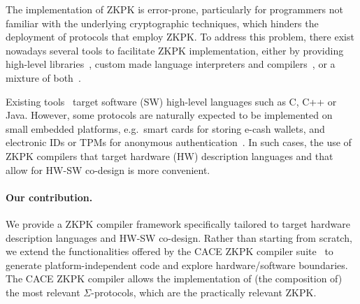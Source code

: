 
The implementation of ZKPK is error-prone, particularly for programmers not familiar with the underlying cryptographic techniques, which hinders the deployment of protocols that employ ZKPK. To address this problem, there exist nowadays several tools to facilitate ZKPK implementation, either by providing high-level libraries~\cite{Camenisch:2002:DII:586110.586114}, custom made language interpreters and compilers~\cite{Almeida:2010:CCZ:1888881.1888894}, or a mixture of both~\cite{Meiklejohn:2010:ZLS:1929820.1929838}.

Existing tools~\cite{Camenisch:2002:DII:586110.586114,Almeida:2010:CCZ:1888881.1888894,Meiklejohn:2010:ZLS:1929820.1929838} target software (SW) high-level languages such as C, C++ or Java. However, some protocols are naturally expected to be implemented on small embedded platforms, e.g.\ smart cards for storing e-cash wallets, and electronic IDs or TPMs for anonymous authentication~\cite{Brickell:2004:DAA:1030083.1030103}. In such cases, the use of ZKPK compilers that target hardware (HW) description languages and that allow for HW-SW co-design is more convenient.


\paragraph{Our contribution.} We provide a ZKPK compiler framework specifically tailored to target hardware description languages and HW-SW co-design. Rather than starting from scratch, we extend the functionalities offered by the CACE ZKPK compiler suite~\cite{Almeida:2010:CCZ:1888881.1888894} to generate platform-independent code and explore hardware/software boundaries. The CACE ZKPK compiler allows the implementation of (the composition of) the most relevant $\Sigma$-protocols, which are the practically relevant ZKPK. 

